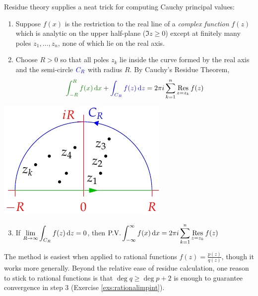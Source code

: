 Residue theory supplies a neat trick for computing Cauchy principal values:\par
\begin{minipage}[t]{0.68\linewidth}\vspace{0pt}
	\begin{enumerate}
	  \item Suppose $f(x)$ is the restriction to the real line of a \emph{complex function} $f(z)$ which is analytic on the upper half-plane ($\Im z\ge 0$) except at finitely many poles $z_1,\ldots,z_n$, none of which lie on the real axis.
	  \item Choose $R>0$ so that all poles $z_k$ lie inside the curve formed by the real axis and the semi-circle $\textcolor{blue}{C_R}$ with radius $R$. By Cauchy's Residue Theorem,
	  \[
	  	\textcolor{Green}{\int_{-R}^Rf(x)\,\dx}+\textcolor{blue}{\int_{C_R}f(z)\,\dz}=2\pi i\sum\limits_{k=1}^n\Resl{z=z_k}f(z)
	  \]
	\end{enumerate}
\end{minipage}
\hfill
\begin{minipage}[t]{0.3\linewidth}\vspace{0pt}
	\flushright\includegraphics[scale=0.95]{integral}
\end{minipage}
\begin{enumerate}\setcounter{enumi}{2}
  \item If $\displaystyle\lim\limits_{R\to\infty}\int_{C_R}f(z)\,{\mathrm{d} z}=0$, then
$\displaystyle\text{P.V.}\int_{-\infty}^\infty f(x)\,{\mathrm{d} x}
=2\pi i\sum\limits_{k=1}^n\operatorname*{Res}_{z=z_k}f(z)$
\end{enumerate}

The method is easiest when applied to rational functions $f(z)=\frac{p(z)}{q(z)}$, though it works more generally. Beyond the relative ease of residue calculation, one reason to stick to rational functions is that $\deg q\ge \deg p+2$ is enough to guarantee convergence in step 3 (Exercise \ref{exs:rationalimpint}).

